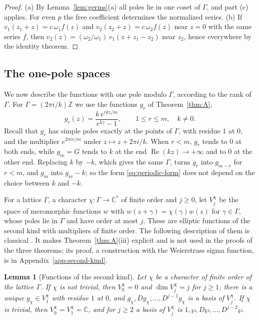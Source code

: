 \documentclass[11pt]{article}
\newtheorem{lemma}[theorem]{Lemma}
\theoremstyle{definition}
\theoremstyle{remark}
\numberwithin{equation}{section}
\newcommand{\CC}{\mathbb C}
\newcommand{\ZZ}{\mathbb Z}
\begin{document}
\begin{proof}
(a) By Lemma~\ref{lem:germs}(a) all poles lie in one coset of
\(\Gamma\), and part (c) applies. For even \(p\) the free coefficient
determines the normalized series. (b) If
\(v_1(z_1+z)=c\,\omega_1f(z)\) and \(v_2(z_2+z)=c\,\omega_2f(z)\) near
\(z=0\) with the same series \(f\), then
\(v_2(z)=(\omega_2/\omega_1)\,v_1(z+z_1-z_2)\) near \(z_2\), hence
everywhere by the identity theorem.
\end{proof}

\subsection{The one-pole spaces}\label{sec:spaces}

We now describe the functions with one pole modulo \(\Gamma\),
according to the rank of \(\Gamma\). For \(\Gamma=(2\pi i/k)\ZZ\) we
use the functions \(g_r\) of Theorem~\ref{thm:A},
\begin{equation}\label{eq:generator}
 g_r(z)=\frac{k\,e^{rkz/m}}{e^{kz}-1},\qquad 1\le r\le m,\quad k\ne0.
\end{equation}
Recall that \(g_r\) has simple poles exactly at the points of
\(\Gamma\), with residue \(1\) at \(0\), and the multiplier
\(e^{2\pi ir/m}\) under \(z\mapsto z+2\pi i/k\). When \(r<m\), \(g_r\) tends to \(0\) at both
ends, while \(g_m=G\) tends to \(k\) at the end
\(\operatorname{Re}(kz)\to+\infty\) and to \(0\) at the other end.
Replacing \(k\) by \(-k\), which gives the same \(\Gamma\), turns
\(g_r\) into \(g_{m-r}\) for \(r<m\), and \(g_m\) into \(g_m-k\); so
the form \eqref{eq:periodic-form} does not depend on the choice between
\(k\) and \(-k\).

For a lattice \(\Gamma\), a character \(\chi\colon\Gamma\to\CC^*\) of
finite order and \(j\ge0\), let \(V_j^\chi\) be the space of
meromorphic functions \(w\) with \(w(z+\gamma)=\chi(\gamma)w(z)\) for
\(\gamma\in\Gamma\), whose poles lie in \(\Gamma\) and have order at
most \(j\). These are elliptic functions of the second kind with
multipliers of finite order. The following description of them is
classical \citep{Hermite1885,AppellLacour1897}. It makes
Theorem~\ref{thm:A}(iii) explicit and is not used in the proofs of the
three theorems; its proof, a construction with the Weierstrass sigma
function, is in Appendix~\ref{app:second-kind}.

\begin{lemma}[Functions of the second kind]\label{lem:second-kind}
Let \(\chi\) be a character of finite order of the lattice \(\Gamma\).
If \(\chi\) is not trivial, then \(V_0^\chi=0\) and
\(\dim V_j^\chi=j\) for \(j\ge1\); there is a unique
\(g_\chi\in V_1^\chi\) with residue \(1\) at \(0\), and
\(g_\chi,Dg_\chi,\dots,D^{j-1}g_\chi\) is a basis of \(V_j^\chi\). If
\(\chi\) is trivial, then \(V_0^\chi=V_1^\chi=\CC\), and for \(j\ge2\)
a basis of \(V_j^\chi\) is \(1,\wp,D\wp,\dots,D^{j-2}\wp\).
\end{lemma}
\end{document}

